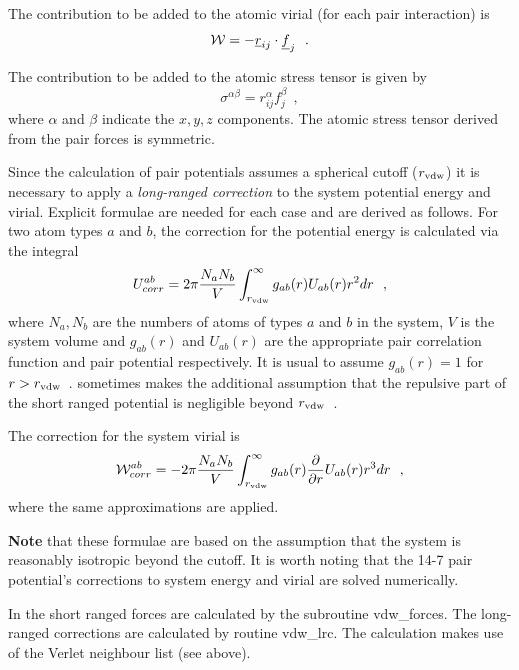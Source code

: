 The contribution to be added to the atomic virial (for each pair
interaction) is
\begin{equation}
{\cal W} = -\mbox{$\underline{r}$}_{ij} \cdot \mbox{$\underline{f}$}_{j}~~.
\end{equation}

The contribution to be added to the atomic stress tensor is
given by
\begin{equation}
\sigma^{\alpha \beta} = r_{ij}^{\alpha}f_{j}^{\beta}~~,
\end{equation}
where $\alpha$ and $\beta$ indicate the $x,y,z$ components.  The
atomic stress tensor derived from the pair
forces is symmetric.

Since the calculation of pair potentials assumes a spherical
cutoff ($r_{\rm vdw}$) it is necessary to apply a {\em long-ranged
correction} to the
system potential energy and virial.  Explicit formulae are needed
for each case and are derived as follows.  For two atom types $a$
and $b$, the correction for the potential energy is calculated via
the integral
\begin{equation}
U_{corr}^{ab} = 2\pi
\frac{N_{a}N_{b}}{V}\int_{r_{\rm vdw}}^{\infty}g_{ab}(r)U_{ab}(r)r^{2}dr~~,
\end{equation}
where $N_{a},N_{b}$ are the numbers of atoms of types $a$ and $b$
in the system, $V$ is the system volume and $g_{ab}(r)$ and
$U_{ab}(r)$ are the appropriate pair correlation function and pair
potential respectively.  It is usual to assume $g_{ab}(r)=1$ for
$r>r_{\rm vdw}$~.  \D sometimes makes the additional assumption that
the repulsive part of the short ranged potential is negligible
beyond $r_{\rm vdw}$~.

The correction for the system virial is
\begin{equation}
{\cal W}_{corr}^{ab} = -2\pi \frac{N_{a}N_{b}}{V}
\int_{r_{\rm vdw}}^{\infty}g_{ab}(r) \frac{\partial}{\partial
r}U_{ab}(r)r^{3}dr~~,
\end{equation}
where the same approximations are applied.

{\bf Note} that these formulae are based on the assumption that the
system is reasonably isotropic beyond the cutoff.  It is worth noting
that the 14-7 pair potential's corrections to system energy and virial
are solved numerically.

In \D the short ranged forces are calculated by the subroutine
{\sc vdw\_forces}.  The long-ranged corrections are calculated by
routine {\sc vdw\_lrc}.  The calculation makes use of the
Verlet neighbour list (see above).

